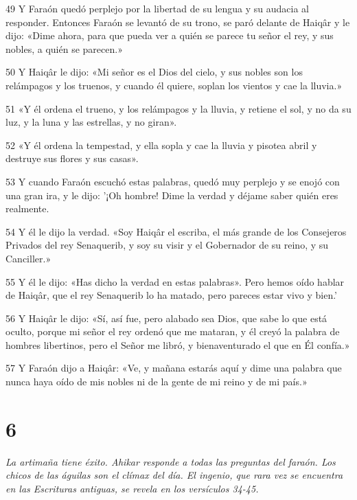 \par 49 Y Faraón quedó perplejo por la libertad de su lengua y su audacia al responder. Entonces Faraón se levantó de su trono, se paró delante de Haiqâr y le dijo: «Dime ahora, para que pueda ver a quién se parece tu señor el rey, y sus nobles, a quién se parecen.»

\par 50 Y Haiqâr le dijo: «Mi señor es el Dios del cielo, y sus nobles son los relámpagos y los truenos, y cuando él quiere, soplan los vientos y cae la lluvia.»

\par 51 «Y él ordena el trueno, y los relámpagos y la lluvia, y retiene el sol, y no da su luz, y la luna y las estrellas, y no giran».

\par 52 «Y él ordena la tempestad, y ella sopla y cae la lluvia y pisotea abril y destruye sus flores y sus casas».

\par 53 Y cuando Faraón escuchó estas palabras, quedó muy perplejo y se enojó con una gran ira, y le dijo: '¡Oh hombre! Dime la verdad y déjame saber quién eres realmente.

\par 54 Y él le dijo la verdad. «Soy Haiqâr el escriba, el más grande de los Consejeros Privados del rey Senaquerib, y soy su visir y el Gobernador de su reino, y su Canciller.»

\par 55 Y él le dijo: «Has dicho la verdad en estas palabras». Pero hemos oído hablar de Haiqâr, que el rey Senaquerib lo ha matado, pero pareces estar vivo y bien.'

\par 56 Y Haiqâr le dijo: «Sí, así fue, pero alabado sea Dios, que sabe lo que está oculto, porque mi señor el rey ordenó que me mataran, y él creyó la palabra de hombres libertinos, pero el Señor me libró, y bienaventurado el que en Él confía.»

\par 57 Y Faraón dijo a Haiqâr: «Ve, y mañana estarás aquí y dime una palabra que nunca haya oído de mis nobles ni de la gente de mi reino y de mi país.»

\chapter{6}

\par \textit{La artimaña tiene éxito. Ahikar responde a todas las preguntas del faraón. Los chicos de las águilas son el clímax del día. El ingenio, que rara vez se encuentra en las Escrituras antiguas, se revela en los versículos 34-45.}


